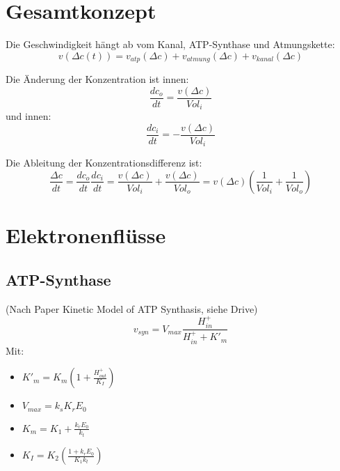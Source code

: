 \documentclass[11pts]{scrartcl}
\begin{document}
	\section{Gesamtkonzept}
		Die \glqq Geschwindigkeit\grqq{} hängt ab vom Kanal, ATP-Synthase und Atmungskette: \[v(\Delta c(t)) = v_{atp}(\Delta c) + v_{atmung}(\Delta c) + v_{kanal}(\Delta c)\]
		
		Die Änderung der Konzentration ist innen: \[ \frac{dc_o}{dt} = \frac{v(\Delta c)}{Vol_i} \]
		und innen: \[ \frac{dc_i}{dt} = - \frac{v(\Delta c)}{Vol_i} \]
		
		Die Ableitung der Konzentrationsdifferenz ist: \[ \frac{\Delta c}{dt} =  \frac{dc_o}{dt} \frac{dc_i}{dt} = \frac{v(\Delta c)}{Vol_i} + \frac{v(\Delta c)}{Vol_o} = v(\Delta c)  \left( \frac{1}{Vol_i} + \frac{1}{Vol_o} \right) \]
	
	\section{Elektronenflüsse}
		\subsection{ATP-Synthase}
		(Nach Paper \glqq Kinetic Model of ATP Synthasis\grqq , siehe Drive)
			\[ v_{syn} = V_{max} \frac{H^+_{in}}{H^+_{in} + K'_m }   \]
			Mit:
			\begin{itemize}
				\item $K'_m = K_m (1 + \frac{H^+_{out}}{K_I})$
				\item $V_{max} = k_s K_r E_0$
				\item $K_m = K_1 + \frac{k_r E_0}{k_t}$
				\item $K_I = K_2 \left( \frac{1+k_r E_0}{K_1 k_t } \right) $
			\end{itemize}
\end{document}
